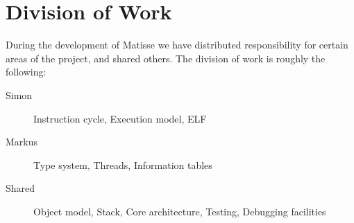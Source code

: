 \documentclass[11pt]{article}
\newcommand{\thename}{Matisse}
\begin{document}
\onehalfspacing{}

\section*{Division of Work}

During the development of \thename{} we have distributed responsibility for
certain areas of the project, and shared others. The division of work is roughly the following:

\begin{description}
\item[Simon] Instruction cycle, Execution model, ELF
\item[Markus] Type system, Threads, Information tables
\item[Shared] Object model, Stack, Core architecture, Testing, Debugging facilities
\end{description}
\end{document}
